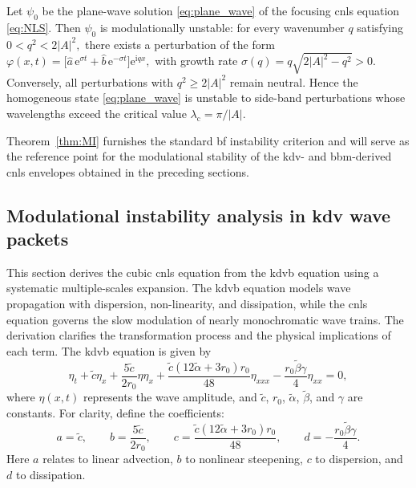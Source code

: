 \documentclass[alpha-refs, 12pt]{wiley-article}
\begin{document}
\begin{theorem}\label{thm:MI}
  Let $\psi_{0}$ be the plane-wave solution \eqref{eq:plane_wave} of the
  focusing \acrshort{cnls} equation \eqref{eq:NLS}. Then $\psi_{0}$ is modulationally unstable: for every wavenumber $q$ satisfying
  \(
    0<q^{2}<2|A|^{2},
  \)
  there exists a perturbation of the form
  \(
    \displaystyle
    \varphi(x,t)=\bigl[\hat{a}\,\mathrm{e}^{\sigma t}
                     +\hat{b}\,\mathrm{e}^{-\sigma t}\bigr]
                 \mathrm{e}^{\mathrm{i}qx},
  \)
  with growth rate
  \(
    \displaystyle
    \sigma(q)=q\sqrt{2|A|^{2}-q^{2}}>0.
  \)
  Conversely, all perturbations with $q^{2}\ge2|A|^{2}$ remain
  neutral. Hence the homogeneous state \eqref{eq:plane_wave} is unstable
  to side-band perturbations whose wavelengths exceed the critical value
  \(
    \lambda_{\mathrm{c}}=\pi/|A|.
  \)
\end{theorem}
Theorem~\ref{thm:MI} furnishes the standard \acrlong{bf} instability criterion and will serve as the reference point for the modulational stability of the \acrshort{kdv}- and \acrshort{bbm}-derived \acrshort{cnls} envelopes obtained in the preceding sections.

\subsection{Modulational instability analysis in \acrshort{kdv} wave packets}

This section derives the cubic \acrfull{cnls} equation from the \acrfull{kdvb} equation using a systematic multiple-scales expansion. The \acrshort{kdvb} equation models wave propagation with dispersion, non-linearity, and dissipation, while the \acrshort{cnls} equation governs the slow modulation of nearly monochromatic wave trains. The derivation clarifies the transformation process and the physical implications of each term. The \acrshort{kdvb} equation is given by
\begin{equation}
  \eta_{t} + \tilde{c} \eta_{x} + \frac{5 \tilde{c}}{2 r_{0}} \eta \eta_{x} + \frac{\tilde{c} (12 \tilde{\alpha} + 3 r_{0}) r_{0}}{48} \eta_{xxx} - \frac{r_{0} \tilde{\beta} \gamma}{4} \eta_{xx} = 0,
  \label{eq:kdv_burgers}
\end{equation}
where \(\eta(x,t)\) represents the wave amplitude, and \(\tilde{c}\), \(r_{0}\), \(\tilde{\alpha}\), \(\tilde{\beta}\), and \(\gamma\) are constants. For clarity, define the coefficients:
\begin{equation}
  a = \tilde{c}, \qquad b = \frac{5 \tilde{c}}{2 r_{0}}, \qquad c = \frac{\tilde{c} (12 \tilde{\alpha} + 3 r_{0}) r_{0}}{48}, \qquad d = -\frac{r_{0} \tilde{\beta} \gamma}{4}.
  \label{eq:coeffs}
\end{equation}
Here \(a\) relates to linear advection, \(b\) to nonlinear steepening, \(c\) to dispersion, and \(d\) to dissipation.
\end{document}
